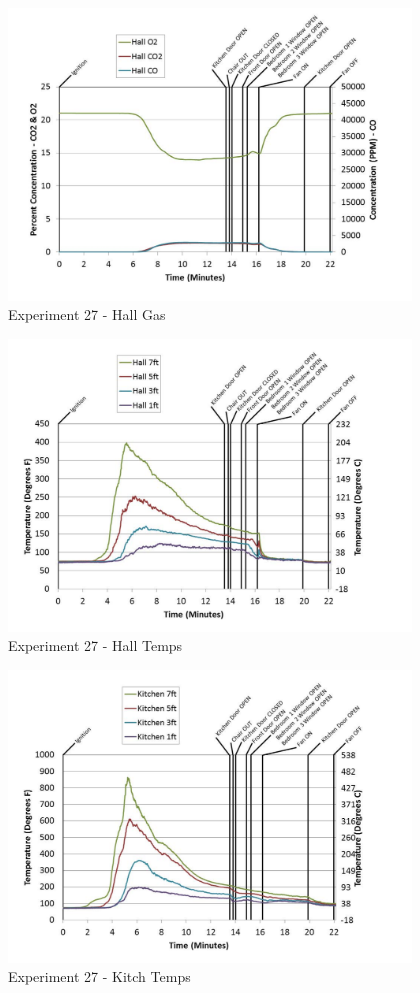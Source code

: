 \documentclass{article}
\begin{document}
\begin{appendices}
	\begin{figure}[h!]
		\centering
		\includegraphics[height=3.05in]{0_Images/Results_Charts/Exp_27_Charts/HallGas.pdf}
		\caption{Experiment 27 - Hall Gas}
	\end{figure}
 
	\clearpage

	\begin{figure}[h!]
		\centering
		\includegraphics[height=3.05in]{0_Images/Results_Charts/Exp_27_Charts/HallTemps.pdf}
		\caption{Experiment 27 - Hall Temps}
	\end{figure}
 

	\begin{figure}[h!]
		\centering
		\includegraphics[height=3.05in]{0_Images/Results_Charts/Exp_27_Charts/KitchTemps.pdf}
		\caption{Experiment 27 - Kitch Temps}
	\end{figure}
 

\end{appendices}
\end{document}
